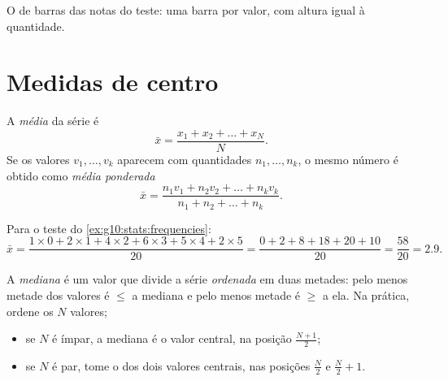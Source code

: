 \begin{omfigure}

{\small O  de barras das notas do teste: uma barra por valor, com
altura igual à quantidade.}
\end{omfigure}

\section{Medidas de centro}

\begin{definition}[Média]\label{def:g10:stats:mean}
A \emph{média} da série é
\[
\bar x = \frac{x_1 + x_2 + \dots + x_N}{N}.
\]
Se os valores $v_1, \dots, v_k$ aparecem com quantidades
$n_1, \dots, n_k$, o mesmo número é obtido como \emph{média ponderada}
\[
\bar x = \frac{n_1 v_1 + n_2 v_2 + \dots + n_k v_k}{n_1 + n_2 + \dots + n_k}.
\]
\end{definition}

\begin{example}\label{ex:g10:stats:mean}
Para o teste do \cref{ex:g10:stats:frequencies}:
\[
\bar x = \frac{1 \times 0 + 2 \times 1 + 4 \times 2 + 6 \times 3
+ 5 \times 4 + 2 \times 5}{20}
= \frac{0 + 2 + 8 + 18 + 20 + 10}{20}
= \frac{58}{20} = 2.9 .
\]
\end{example}

\begin{definition}[Mediana]\label{def:g10:stats:median}
A \emph{mediana} é um valor que divide a série
\emph{ordenada} em duas metades: pelo menos metade dos valores é
$\leq$ a mediana e pelo menos metade é $\geq$ a ela. Na prática, ordene
os $N$ valores;
\begin{itemize}
  \item se $N$ é ímpar, a mediana é o valor central, na posição
        $\frac{N+1}{2}$;
  \item se $N$ é par, tome o  dos dois valores centrais, nas
        posições $\frac N2$ e $\frac N2 + 1$.
\end{itemize}
\end{definition}

